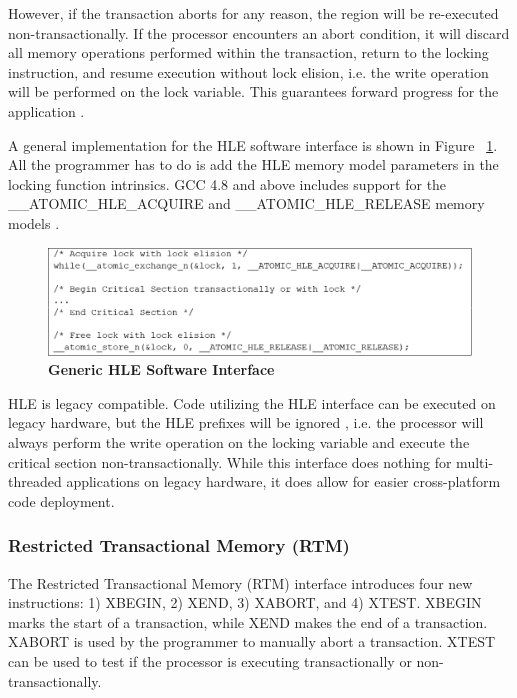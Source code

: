 \documentclass[a4paper]{article}
\begin{document}
\indent 
However, if the transaction aborts for any reason, the region will be
re-executed non-transactionally.  If the processor encounters an abort
condition, it will discard all memory operations performed within the
transaction, return to the locking instruction, and resume execution without
lock elision, i.e. the write operation will be performed on the lock variable.
This guarantees forward progress for the application \cite{intel_prog_ref}.
\par

\indent 
A general implementation for the HLE software interface is shown in Figure
~\ref{fig:hle_interface}.  All the programmer has to do is add the HLE memory
model parameters in the locking function intrinsics.  GCC 4.8 and above includes
support for the \_\_ATOMIC\_HLE\_ACQUIRE and \_\_ATOMIC\_HLE\_RELEASE memory
models \cite{gcc}.
\par

\begin{figure}[H]
    \centering
    \graphicspath{ {./figures/} }
    \includegraphics[width=\textwidth,height=\textheight,keepaspectratio]{fig_hleInterface}
    \caption{\textbf{Generic HLE Software Interface}}
    \label{fig:hle_interface}
\end{figure}

\indent
HLE is legacy compatible.  Code utilizing the HLE interface can be executed on
legacy hardware, but the HLE prefixes will be ignored \cite{intel_prog_ref},
i.e. the processor will always perform the write operation on the locking
variable and execute the critical section non-transactionally.  While this
interface does nothing for multi-threaded applications on legacy hardware, it
does allow for easier cross-platform code deployment.
\par

\subsubsection{\textbf{Restricted Transactional Memory (RTM)}}

\indent 
The Restricted Transactional Memory (RTM) interface introduces four new
instructions: 1) XBEGIN, 2) XEND, 3) XABORT, and 4) XTEST.  XBEGIN marks the
start of a transaction, while XEND makes the end of a transaction.  XABORT is
used by the programmer to manually abort a transaction.  XTEST can be used to
test if the processor is executing transactionally or non-transactionally.
\par
\end{document}
